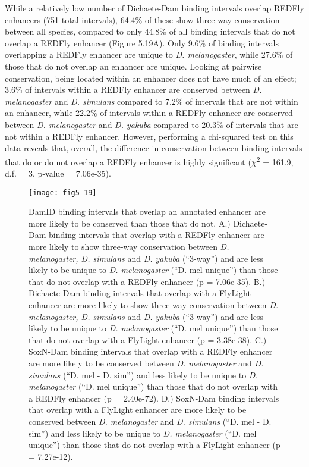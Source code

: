 While a relatively low number of Dichaete-Dam binding intervals overlap REDFly enhancers (751 total intervals), 64.4\% of these show three-way conservation between all species, compared to only 44.8\% of all binding intervals that do not overlap a REDFly enhancer (Figure 5.19A). Only 9.6\% of binding intervals overlapping a REDFly enhancer are unique to \emph{D. melanogaster}, while 27.6\% of those that do not overlap an enhancer are unique. Looking at pairwise conservation, being located within an enhancer does not have much of an effect; 3.6\% of intervals within a REDFly enhancer are conserved between \emph{D. melanogaster} and \emph{D. simulans} compared to 7.2\% of intervals that are not within an enhancer, while 22.2\% of intervals within a REDFly enhancer are conserved between \emph{D. melanogaster} and \emph{D. yakuba} compared to 20.3\% of intervals that are not within a REDFly enhancer. However, performing a chi-squared test on this data reveals that, overall, the difference in conservation between binding intervals that do or do not overlap a REDFly enhancer is highly significant (\(\chi\)\textsuperscript{2} = 161.9, d.f. = 3, p-value = 7.06e-35).

\begin{figure}
\centering
\texttt{[image: fig5-19]}
\caption[DamID binding intervals that overlap an annotated enhancer are more likely to be conserved than those that do not]{DamID binding intervals that overlap an annotated enhancer are more likely to be conserved than those that do not. A.) Dichaete-Dam binding intervals that overlap with a REDFly enhancer are more likely to show three-way conservation between \emph{D. melanogaster, D. simulans} and \emph{D. yakuba} (“3-way”) and are less likely to be unique to \emph{D. melanogaster}  (“D. mel unique”) than those that do not overlap with a REDFly enhancer (p = 7.06e-35).  B.) Dichaete-Dam binding intervals that overlap with a FlyLight enhancer are more likely to show three-way conservation between \emph{D. melanogaster, D. simulans} and \emph{D. yakuba} (“3-way”) and are less likely to be unique to \emph{D. melanogaster}  (“D. mel unique”) than those that do not overlap with a FlyLight enhancer (p = 3.38e-38). C.) SoxN-Dam binding intervals that overlap with a REDFly enhancer are more likely to be conserved between \emph{D. melanogaster} and \emph{D. simulans} (“D. mel - D. sim”) and less likely to be unique to \emph{D. melanogaster} (“D. mel unique”) than those that do not overlap with a REDFly enhancer (p = 2.40e-72). D.) SoxN-Dam binding intervals that overlap with a FlyLight enhancer are more likely to be conserved between \emph{D. melanogaster} and \emph{D. simulans} (“D. mel - D. sim”) and less likely to be unique to \emph{D. melanogaster} (“D. mel unique”) than those that do not overlap with a FlyLight enhancer (p = 7.27e-12).}
\label{Figure 5.19}
\end{figure}
 
